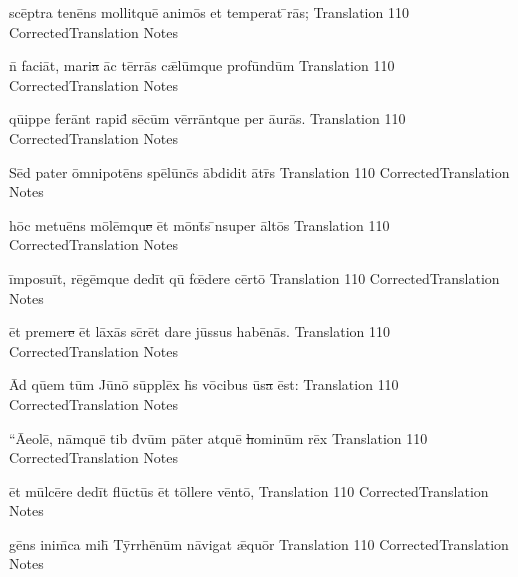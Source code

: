 \documentclass[]{book}
\begin{document}
\latline
  {sc\={\macron e}ptr\-a t\-en\={\macron e}ns m\-oll\-itqu\=e \-an\-im\={\macron o}s et temperat \={\macron {\i}}r\={\macron a}s;
}
  { Translation }
  {110}
  { CorrectedTranslation }
  { Notes }


\latline
  {n\={\macron {\i}} f\-ac\-i\=at, m\-ar\-i\sout{a }\=ac t\=err\={\macron a}s c\={\ae}l\=umqu\-e pr\-of\=und\=um
}
  { Translation }
  {110}
  { CorrectedTranslation }
  { Notes }

\newpage
\latline
  {q\={ui}pp\-e f\-er\=ant r\-ap\-id\={\macron {\i}} s\={\macron e}c\=um v\=err\=antqu\-e p\-er \={au}r\={\macron a}s.
}
  { Translation }
  {110}
  { CorrectedTranslation }
  { Notes }


\latline
  {S\=ed p\-at\-er \=omn\-ip\-ot\={\macron e}ns sp\={\macron e}l\=unc\={\macron {\i}}s \=abd\-id\-it \={\macron a}tr\={\macron {\i}}s
}
  { Translation }
  {110}
  { CorrectedTranslation }
  { Notes }


\latline
  {h\=oc m\-et\-u\={\macron e}ns m\={\macron o}l\=emqu\sout{e }\=et m\=ont\={\macron {\i}}s \={\macron {\i}}ns\-upe\-r \=alt\={\macron o}s
}
  { Translation }
  {110}
  { CorrectedTranslation }
  { Notes }

\newpage
\latline
  {\=imp\-os\-u\=it, r\={\macron e}g\=emqu\-e d\-ed\=it qu\={\macron {\i}} f\={\oe}d\-er\-e c\=ert\={\macron o}
}
  { Translation }
  {110}
  { CorrectedTranslation }
  { Notes }


\latline
  {\=et pr\-em\-er\sout{e }\=et l\=ax\={\macron a}s sc\={\macron {\i}}r\=et d\-ar\-e j\=uss\-us h\-ab\={\macron e}n\={\macron a}s.
}
  { Translation }
  {110}
  { CorrectedTranslation }
  { Notes }


\latline
  {\=Ad q\=uem t\=um J\={\macron u}n\={\macron o} s\=uppl\=ex h\={\macron {\i}}s v\={\macron o}c\-ib\-us \={\macron u}s\sout{a }\=est:
}
  { Translation }
  {110}
  { CorrectedTranslation }
  { Notes }

\newpage
\latline
  {``\=A\-e\-ol\=e, n\=amqu\=e t\-ib\-{\macron {\i}} d\={\macron {\i}}v\=um p\=at\-er \-atqu\=e\sout{ h}\-om\-in\=um r\={\macron e}x
}
  { Translation }
  {110}
  { CorrectedTranslation }
  { Notes }


\latline
  {\=et m\=ulc\={\macron e}r\-e d\-ed\=it fl\={\macron u}ct\={\macron u}s \=et t\=oll\-er\-e v\=ent\={\macron o},
}
  { Translation }
  {110}
  { CorrectedTranslation }
  { Notes }


\latline
  {g\={\macron e}ns \-in\-im\={\macron {\i}}c\-a m\-ih\={\macron {\i}} T\=yrrh\={\macron e}n\=um n\={\macron a}v\-ig\-at \={\ae}qu\=or
}
  { Translation }
  {110}
  { CorrectedTranslation }
  { Notes }
\end{document}
